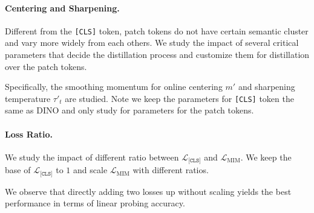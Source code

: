 \documentclass{article} %
\begin{document}
\paragraph{Centering and Sharpening.} Different from the \texttt{[CLS]} token, patch tokens do not have certain semantic cluster and vary more widely from each others. We study the impact of several critical parameters that decide the distillation process and customize them for distillation over the patch tokens.
\vspace{-0.3cm}
\begin{table}[H]
\centering
{}
\end{table}
\vspace{-0.7cm}
Specifically, the smoothing momentum for online centering $m'$ and sharpening temperature $\tau'_t$ are studied. Note we keep the parameters for \texttt{[CLS]} token the same as DINO and only study for parameters for the patch tokens. 

\paragraph{Loss Ratio.} We study the impact of different ratio between $\mathcal{L}_\texttt{[CLS]}$ and $\mathcal{L}_\mathrm{MIM}$. We keep the base of $\mathcal{L}_\texttt{[CLS]}$ to $1$ and scale $\mathcal{L}_\mathrm{MIM}$ with different ratios.
\vspace{-0.3cm}
\begin{table}[H]
\centering
{}
\end{table}
\vspace{-0.7cm}
We observe that directly adding two losses up without scaling yields the best performance in terms of linear probing accuracy. 
\end{document}
